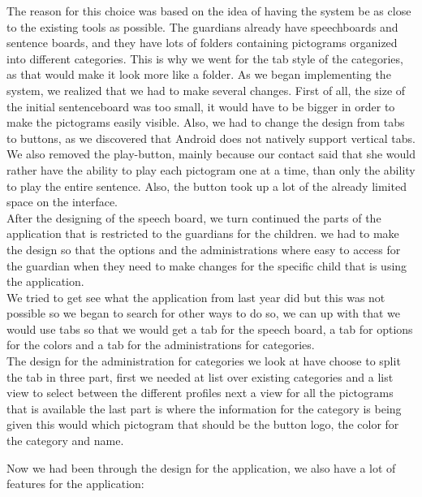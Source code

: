 The reason for this choice was based on the idea of having the system be as close to the existing tools as possible. The guardians already have speechboards and sentence boards, and they have lots of folders containing pictograms organized into different categories. This is why we went for the tab style of the categories, as that would make it look more like a folder.\newline
As we began implementing the system, we realized that we had to make several changes. First of all, the size of the initial sentenceboard was too small, it would have to be bigger in order to make the pictograms easily visible. Also, we had to change the design from tabs to buttons, as we discovered that Android does not natively support vertical tabs. We also removed the play-button, mainly because our contact said that she would rather have the ability to play each pictogram one at a time, than only the ability to play the entire sentence. Also, the button took up a lot of the already limited space on the interface.\newline
\\
After the designing of the speech board, we turn continued the parts of the application that is restricted to the guardians for the children. we had to make the design so that the options and the administrations where easy to access for the guardian when they need to make changes for the specific child that is using the application. 
\\
We tried to get see what the application from last year did but this was not possible so we began to search for other ways to do so, we can up with that we would use tabs so that we would get a tab for the speech board, a tab for options for the colors and a tab for the administrations for categories.\\

The design for the administration for categories we look at have choose to split the tab in three part, first we needed at list over existing categories and a list view to select between the different profiles next a view for all the pictograms that is available the last part is where the information for the category is being given this would which pictogram that should be the button logo, the color for the category and name.  

Now we had been through the design for the application, we also have a lot of features for the application: 

